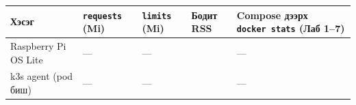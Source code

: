 \begingroup\scriptsize\begin{longtable}[]{@{}lllll@{}}
\toprule
\begin{minipage}[b]{0.17\columnwidth}\raggedright
Хэсэг\strut
\end{minipage} & \begin{minipage}[b]{0.17\columnwidth}\raggedright
\texttt{requests} (Mi)\strut
\end{minipage} & \begin{minipage}[b]{0.17\columnwidth}\raggedright
\texttt{limits} (Mi)\strut
\end{minipage} & \begin{minipage}[b]{0.17\columnwidth}\raggedright
Бодит RSS\strut
\end{minipage} & \begin{minipage}[b]{0.17\columnwidth}\raggedright
Compose дээрх \texttt{docker\ stats} (Лаб 1--7)\strut
\end{minipage}\tabularnewline
\midrule
\endhead
\begin{minipage}[t]{0.17\columnwidth}\raggedright
Raspberry Pi OS Lite\strut
\end{minipage} & \begin{minipage}[t]{0.17\columnwidth}\raggedright
---\strut
\end{minipage} & \begin{minipage}[t]{0.17\columnwidth}\raggedright
---\strut
\end{minipage} & \begin{minipage}[t]{0.17\columnwidth}\raggedright
\strut
\end{minipage} & \begin{minipage}[t]{0.17\columnwidth}\raggedright
---\strut
\end{minipage}\tabularnewline
\begin{minipage}[t]{0.17\columnwidth}\raggedright
k3s agent (pod биш)\strut
\end{minipage} & \begin{minipage}[t]{0.17\columnwidth}\raggedright
---\strut
\end{minipage} & \begin{minipage}[t]{0.17\columnwidth}\raggedright
---\strut
\end{minipage} & \begin{minipage}[t]{0.17\columnwidth}\raggedright
\strut
\end{minipage} & \begin{minipage}[t]{0.17\columnwidth}\raggedright
---\strut
\end{minipage}\tabularnewline

\end{longtable}
